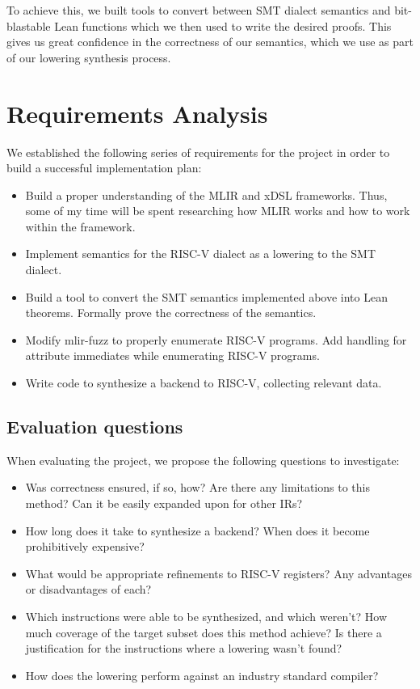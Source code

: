 To achieve this, we built tools to convert between SMT dialect semantics and bit-blastable Lean 
functions which we then used to write the desired proofs. This gives us great confidence in the 
correctness of our semantics, which we use as part of our lowering synthesis process.



\section{Requirements Analysis}

We established the following series of requirements for the project in order to build a successful
implementation plan:

\begin{itemize}
  
\item Build a proper understanding of the MLIR and xDSL frameworks. 
Thus, some of my time will be spent researching how MLIR works and how to work within the 
framework.

\item Implement semantics for the RISC-V dialect as a lowering to the SMT dialect. 

\item Build a tool to convert the SMT semantics implemented above into Lean theorems. 
Formally prove the correctness of the semantics.

\item Modify mlir-fuzz to properly enumerate RISC-V programs. Add handling for attribute immediates
while enumerating RISC-V programs.

\item Write code to synthesize a backend to RISC-V, collecting relevant data.

\end{itemize}

\subsection{Evaluation questions}
\label{evaluation-questions}
When evaluating the project, we propose the following questions to investigate:
\begin{itemize}
\item Was correctness ensured, if so, how? Are there any limitations to this method? Can it be easily expanded 
upon for other IRs?
\item How long does it take to synthesize a backend? When does it become prohibitively expensive?
\item What would be appropriate refinements to RISC-V registers? Any advantages or disadvantages of each?
\item Which instructions were able to be synthesized, and which weren't? How much coverage of the target
subset does this method achieve? Is there a justification for the instructions where a lowering wasn't found?
\item How does the lowering perform against an industry standard compiler?

\end{itemize}

